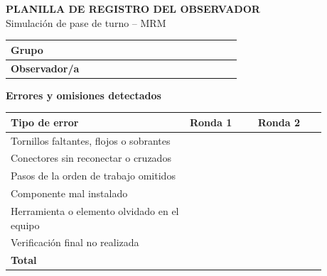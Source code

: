 \clearpage
\begin{center}
{\large\bfseries PLANILLA DE REGISTRO DEL OBSERVADOR}\\[2pt]
{\small Simulación de pase de turno -- MRM}
\end{center}

\renewcommand{\arraystretch}{1.6}
\noindent
\begin{tabular}{|>{\raggedright\arraybackslash}p{0.34\linewidth}|p{0.595\linewidth}|}
\hline
\textbf{Grupo} & \\ \hline
\textbf{Observador/a} & \\ \hline
\end{tabular}

\vspace{8pt}
\noindent\textbf{Errores y omisiones detectados}\\[2pt]
\begin{tabular}{|p{0.50\linewidth}|>{\centering\arraybackslash}p{0.19\linewidth}|>{\centering\arraybackslash}p{0.19\linewidth}|}
\hline
\textbf{Tipo de error} & \textbf{Ronda 1} & \textbf{Ronda 2} \\ \hline
Tornillos faltantes, flojos o sobrantes & & \\ \hline
Conectores sin reconectar o cruzados & & \\ \hline
Pasos de la orden de trabajo omitidos & & \\ \hline
Componente mal instalado & & \\ \hline
Herramienta o elemento olvidado en el equipo & & \\ \hline
Verificación final no realizada & & \\ \hline
\textbf{Total} & & \\ \hline
\end{tabular}

